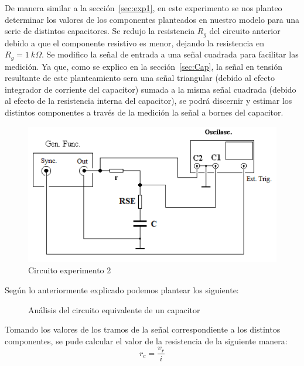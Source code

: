 \label{sec:exp2}
De manera similar a la sección~\ref{sec:exp1}, en este experimento se nos planteo determinar los valores de los componentes planteados en nuestro modelo para una serie de distintos capacitores. Se redujo la resistencia $R_g$ del circuito anterior debido a que el componente resistivo es menor, dejando la resistencia en $R_g=1~k\Omega$. Se modifico la señal de entrada a una señal cuadrada para facilitar las medición. Ya que, como se explico en la sección~\ref{sec:Cap}, la señal en tensión resultante de este planteamiento sera una señal triangular (debido al efecto integrador de corriente del capacitor) sumada a la misma señal cuadrada (debido al efecto de la resistencia interna del capacitor), se podrá discernir y estimar los distintos componentes a través de la medición la señal a bornes del capacitor.

\begin{figure}[H]
    \centering
    \includegraphics[width=0.7\linewidth]{Imagenes/exp2.png}
    \caption{Circuito experimento 2}
    \label{fig:exp2}
\end{figure}

Según lo anteriormente explicado podemos plantear los siguiente:
\begin{figure}[H]
    \centering
    \begin{minipage}{0.59\textwidth}
        
        \label{fig:enter-label}
    \end{minipage}
    \begin{minipage}{0.29\textwidth}
       
\end{minipage}
\caption{Análisis del circuito equivalente de un capacitor}
\end{figure}
Tomando los valores de los tramos de la señal correspondiente a los distintos componentes, se pude calcular el valor de la resistencia de la siguiente manera:
\begin{equation}
    r_c=\frac{v_r}{i}
\end{equation}


